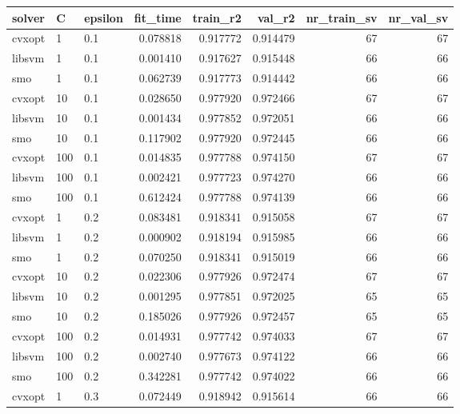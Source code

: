 \begin{tabular}{lllrrrrr}
\toprule
solver &   C & epsilon &  fit\_time &  train\_r2 &   val\_r2 &  nr\_train\_sv &  nr\_val\_sv \\
\midrule
cvxopt &   1 &     0.1 &  0.078818 &  0.917772 & 0.914479 &           67 &         67 \\
libsvm &   1 &     0.1 &  0.001410 &  0.917627 & 0.915448 &           66 &         66 \\
   smo &   1 &     0.1 &  0.062739 &  0.917773 & 0.914442 &           66 &         66 \\
cvxopt &  10 &     0.1 &  0.028650 &  0.977920 & 0.972466 &           67 &         67 \\
libsvm &  10 &     0.1 &  0.001434 &  0.977852 & 0.972051 &           66 &         66 \\
   smo &  10 &     0.1 &  0.117902 &  0.977920 & 0.972445 &           66 &         66 \\
cvxopt & 100 &     0.1 &  0.014835 &  0.977788 & 0.974150 &           67 &         67 \\
libsvm & 100 &     0.1 &  0.002421 &  0.977723 & 0.974270 &           66 &         66 \\
   smo & 100 &     0.1 &  0.612424 &  0.977788 & 0.974139 &           66 &         66 \\
cvxopt &   1 &     0.2 &  0.083481 &  0.918341 & 0.915058 &           67 &         67 \\
libsvm &   1 &     0.2 &  0.000902 &  0.918194 & 0.915985 &           66 &         66 \\
   smo &   1 &     0.2 &  0.070250 &  0.918341 & 0.915019 &           66 &         66 \\
cvxopt &  10 &     0.2 &  0.022306 &  0.977926 & 0.972474 &           67 &         67 \\
libsvm &  10 &     0.2 &  0.001295 &  0.977851 & 0.972025 &           65 &         65 \\
   smo &  10 &     0.2 &  0.185026 &  0.977926 & 0.972457 &           65 &         65 \\
cvxopt & 100 &     0.2 &  0.014931 &  0.977742 & 0.974033 &           67 &         67 \\
libsvm & 100 &     0.2 &  0.002740 &  0.977673 & 0.974122 &           66 &         66 \\
   smo & 100 &     0.2 &  0.342281 &  0.977742 & 0.974022 &           66 &         66 \\
cvxopt &   1 &     0.3 &  0.072449 &  0.918942 & 0.915614 &           66 &         66 \\

\end{tabular}
